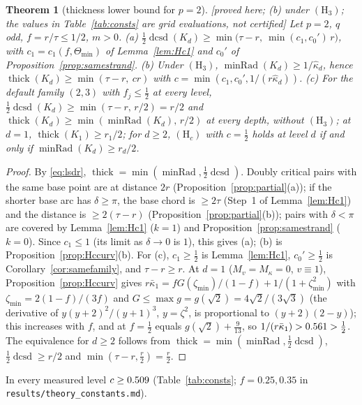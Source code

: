 \documentclass[10pt,a4paper]{article}
\theoremstyle{plain}
\newtheorem{theorem}{Theorem}[section]
\theoremstyle{definition}
\theoremstyle{remark}
\newcommand{\thick}{\operatorname{thick}}
\newcommand{\minRad}{\operatorname{minRad}}
\newcommand{\dcsd}{\operatorname{dcsd}}
\newcommand{\status}[1]{\textsf{\small [#1]}}
\begin{document}
\begin{theorem}[thickness lower bound for $p=2$]\label{thm:Hc}\status{proved here; (b) under $(\mathrm H_3)$; the values in Table~\ref{tab:consts} are grid evaluations, not certified}
Let $p=2$, $q$ odd, $f=r/\tau\le1/2$, $m>0$. (a) $\frac12\dcsd(K_d)\ge\min\bigl(\tau-r,\ \min(c_1,c_0')\,r\bigr)$, with $c_1=c_1(f,\Theta_{\min})$ of Lemma~\ref{lem:Hc1} and $c_0'$ of Proposition~\ref{prop:samestrand}. (b) Under $(\mathrm H_3)$, $\minRad(K_d)\ge1/\hat\kappa_d$, hence $\thick(K_d)\ge\min(\tau-r,\ cr)$ with $c=\min(c_1,c_0',1/(r\hat\kappa_d))$. (c) For the default family $(2,3)$ with $f_j\le\frac12$ at every level, $\frac12\dcsd(K_d)\ge\min(\tau-r,\,r/2)=r/2$ and $\thick(K_d)\ge\min(\minRad(K_d),\,r/2)$ at every depth, without $(\mathrm H_3)$; at $d=1$, $\thick(K_1)\ge r_1/2$; for $d\ge2$, $(\mathrm H_c)$ with $c=\frac12$ holds at level $d$ if and only if $\minRad(K_d)\ge r_d/2$.
\end{theorem}
\begin{proof}
By \eqref{eq:lsdr}, $\thick=\min(\minRad,\frac12\dcsd)$. Doubly critical pairs with the same base point are at distance $2r$ (Proposition~\ref{prop:partial}(a)); if the shorter base arc has $\delta\ge\pi$, the base chord is $\ge2\tau$ (Step~1 of Lemma~\ref{lem:Hc1}) and the distance is $\ge2(\tau-r)$ (Proposition~\ref{prop:partial}(b)); pairs with $\delta<\pi$ are covered by Lemma~\ref{lem:Hc1} ($k=1$) and Proposition~\ref{prop:samestrand} ($k=0$). Since $c_1\le1$ (its limit as $\delta\to0$ is $1$), this gives (a); (b) is Proposition~\ref{prop:Hccurv}(b). For (c), $c_1\ge\frac12$ is Lemma~\ref{lem:Hc1}, $c_0'\ge\frac12$ is Corollary~\ref{cor:samefamily}, and $\tau-r\ge r$. At $d=1$ ($M_v=M_\kappa=0$, $v\equiv1$), Proposition~\ref{prop:Hccurv} gives $r\bar\kappa_1=fG(\zeta_{\min})/(1-f)+1/(1+\zeta_{\min}^2)$ with $\zeta_{\min}=2(1-f)/(3f)$ and $G\le\max g=g(\sqrt2)=4\sqrt2/(3\sqrt3)$ (the derivative of $y(y+2)^2/(y+1)^3$, $y=\zeta^2$, is proportional to $(y+2)(2-y)$); this increases with $f$, and at $f=\frac12$ equals $g(\sqrt2)+\frac9{13}$, so $1/(r\bar\kappa_1)>0.561>\frac12$. The equivalence for $d\ge2$ follows from $\thick=\min(\minRad,\frac12\dcsd)$, $\frac12\dcsd\ge r/2$ and $\min(\tau-r,\frac r2)=\frac r2$.
\end{proof}

In every measured level $c\ge0.509$ (Table~\ref{tab:consts}; $f=0.25,0.35$ in \texttt{results/theory\_constants.md}).
\end{document}
